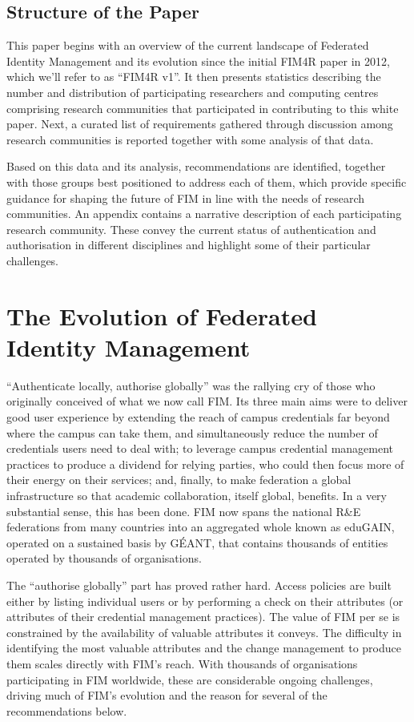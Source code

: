 \documentclass[fleqn,11pt]{wlscirep}
\begin{document}
{\subsection{Structure of the Paper}
This paper begins with an overview of the current landscape of Federated Identity Management and its evolution since the initial FIM4R paper\cite{FIM4Rv1:2012} in 2012, which we’ll refer to as “FIM4R v1”. It then presents statistics describing the number and distribution of participating researchers and computing centres comprising research communities that participated in contributing to this white paper. Next, a curated list of requirements gathered through discussion among research communities is reported together with some analysis of that data. 

Based on this data and its analysis, recommendations are identified, together with those groups best positioned to address each of them, which provide specific guidance for shaping the future of FIM in line with the needs of research communities. An appendix contains a narrative description of each participating research community. These convey the current status of authentication and authorisation in different disciplines and highlight some of their particular challenges. 

\section{The Evolution of Federated Identity Management}
“Authenticate locally, authorise globally” was the rallying cry of those who originally conceived of what we now call FIM. Its three main aims were to deliver good user experience by extending the reach of campus credentials far beyond where the campus can take them, and simultaneously reduce the number of credentials users need to deal with; to leverage campus credential management practices to produce a dividend for relying parties, who could then focus more of their energy on their services; and, finally, to make federation a global infrastructure so that academic collaboration, itself global, benefits. In a very substantial sense, this has been done. FIM now spans the national R\&E federations from many countries into an aggregated whole known as eduGAIN, operated on a sustained basis by GÉANT, that contains thousands of entities operated by thousands of organisations. 

The “authorise globally” part has proved rather hard. Access policies are built either by listing individual users or by performing a check on their attributes (or attributes of their credential management practices). The value of FIM per se is constrained by the availability of valuable attributes it conveys. The difficulty in identifying the most valuable attributes and the change management to produce them scales directly with FIM’s reach. With thousands of organisations participating in FIM worldwide, these are considerable ongoing challenges, driving much of FIM’s evolution and the reason for several of the recommendations below. 

}
\end{document}
